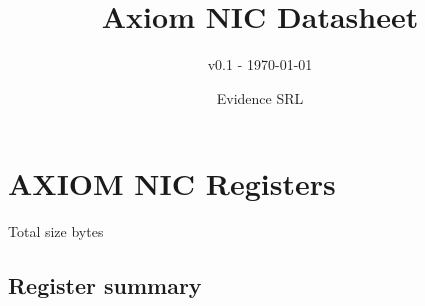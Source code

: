 \documentclass[10pt,a4paper]{paper}
\title{Axiom NIC Datasheet}
\subtitle{v0.1 - \today}
\author{Evidence SRL}
\begin{document}
\maketitle


\section{AXIOM NIC Registers}
\begin{regdescription}
	Total size       bytes\\
\end{regdescription}

\subsection{Register summary}
\end{document}

